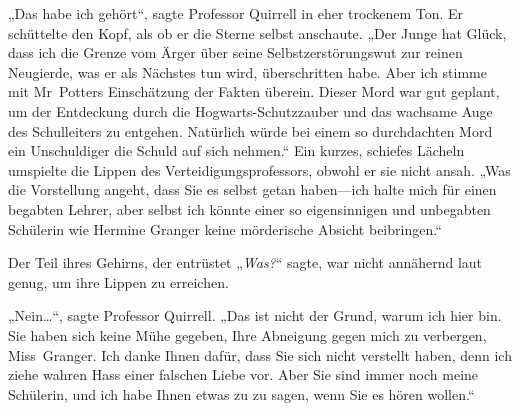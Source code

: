„Das habe ich gehört“, sagte Professor Quirrell in eher trockenem Ton. Er schüttelte den Kopf, als ob er die Sterne selbst anschaute. „Der Junge hat Glück, dass ich die Grenze vom Ärger über seine Selbstzerstörungswut zur reinen Neugierde, was er als Nächstes tun wird, überschritten habe. Aber ich stimme mit Mr~Potters Einschätzung der Fakten überein. Dieser Mord war gut geplant, um der Entdeckung durch die Hogwarts-Schutzzauber und das wachsame Auge des Schulleiters zu entgehen. Natürlich würde bei einem so durchdachten Mord ein Unschuldiger die Schuld auf sich nehmen.“
Ein kurzes, schiefes Lächeln umspielte die Lippen des Verteidigungsprofessors, obwohl er sie nicht ansah.
„Was die Vorstellung angeht, dass Sie es selbst getan haben—ich halte mich für einen begabten Lehrer, aber selbst ich könnte einer so eigensinnigen und unbegabten Schülerin wie Hermine Granger keine mörderische Absicht beibringen.“

Der Teil ihres Gehirns, der entrüstet „\emph{Was?}“ sagte, war nicht annähernd laut genug, um ihre Lippen zu erreichen.

„Nein…“, sagte Professor Quirrell. „Das ist nicht der Grund, warum ich hier bin. Sie haben sich keine Mühe gegeben, Ihre Abneigung gegen mich zu verbergen, Miss~Granger. Ich danke Ihnen dafür, dass Sie sich nicht verstellt haben, denn ich ziehe wahren Hass einer falschen Liebe vor. Aber Sie sind immer noch meine Schülerin, und ich habe Ihnen etwas zu zu sagen, wenn Sie es hören wollen.“

